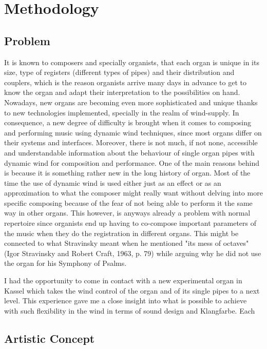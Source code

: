 \chapter{Methodology}

\section{Problem}

It is known to composers and specially organists, that each organ is unique in its size, type of registers (different types of pipes) and their distribution and couplers, which is the reason organists arrive many days in advance to get to know the organ and adapt their interpretation to the possibilities on hand. Nowadays, new organs are becoming even more sophisticated and unique thanks to new technologies implemented, specially in the realm of wind-supply. In consequence, a new degree of difficulty is brought when it comes to composing and performing music using dynamic wind techniques, since most organs differ on their systems and interfaces. Moreover, there is not much, if not none, accessible and understandable information about the behaviour of single organ pipes with dynamic wind for composition and performance. One of the main reasons behind is because it is something rather new in the long history of organ. Most of the time the use of dynamic wind is used either just as an effect or as an approximation to what the composer might really want without delving into more specific composing because of the fear of not being able to perform it the same way in other organs. This however, is anyways already a problem with normal repertoire since organists end up having to co-compose important parameters of the music when they do the registration in different organs. This might be connected to what Stravinsky meant when he mentioned "its mess of octaves" (Igor Stravinsky and Robert Craft, 1963, p. 79) while arguing why he did not use the organ for his Symphony of Psalms. 

I had the opportunity to come in contact with a new experimental organ in Kassel which takes the wind control of the organ and of its single pipes to a next level. This experience gave me a close insight into what is possible to achieve with such flexibility in the wind in terms of sound design and Klangfarbe. Each


\section{Artistic Concept}

